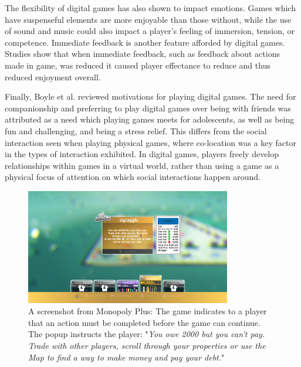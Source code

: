 \documentclass[12pt]{article}
\begin{document}
The flexibility of digital games has also shown to impact emotions. 
Games which have suspenseful elements are more enjoyable than those without, while the use of sound and music could also impact a player's feeling of immersion, tension, or competence.
Immediate feedback is another feature afforded by digital games. 
Studies show that when immediate feedback, such as feedback about actions made in game, was reduced it caused player effectance to reduce and thus reduced enjoyment overall. 

Finally, Boyle et al. reviewed motivations for playing digital games. 
The need for companionship and preferring to play digital games over being with friends was attributed as a need which playing games meets for adolescents, as well as being fun and challenging, and being a stress relief. 
This differs from the social interaction seen when playing physical games, where co-location was a key factor in the types of interaction exhibited. 
In digital games, players freely develop relationships within games in a virtual world, rather than using a game as a physical focus of attention on which social interactions happen around.

\begin{figure}[h]
    \centering
    \includegraphics[width=0.8\textwidth]{images/figures/fig2}
    \caption[A screenshot from Monopoly Plus]{A screenshot from Monopoly Plus: The game indicates to a player that an action must be completed before the game can continue. The popup instructs the player: "\textit{You owe 2000 but you can't pay. Trade with other players, scroll through your properties or use the Map to find a way to make money and pay your debt.}"}
    \label{fig:monopolyplus}
\end{figure}
\end{document}
